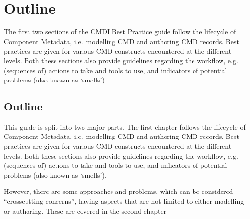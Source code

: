 \section{Outline}\label{outline}

The first two sections of the CMDI Best Practice guide follow the
lifecycle of Component Metadata, i.e.~modelling CMD and authoring CMD records. Best practices are given for various CMD constructs encountered at the different levels. Both these sections also provide guidelines regarding the workflow, e.g. (sequences of) actions to take and tools to use, and indicators of potential problems (also known as `smells').

\begin{workinprogress}

\section{Outline}\label{outline}

This guide is split into two major parts. The first chapter follows the lifecycle of Component Metadata, i.e.~modelling CMD and authoring CMD records. Best practices are given for various CMD constructs encountered at the different levels. Both these sections also provide guidelines regarding the workflow, e.g. (sequences of) actions to take and tools to use, and indicators of potential problems (also known as `smells').

However, there are some approaches and problems, which can be considered ``crosscutting concerns'', having aspects that are not limited to either modelling or authoring. These are covered in the second chapter.

\end{workinprogress}
